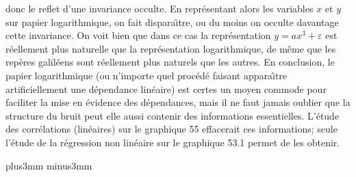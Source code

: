 donc le reflet d'une invariance occulte. 
\medskip 
En repr\'esentant alors les variables $x$ et $y$ sur papier 
logarithmique, on fait dispara{\^\i}tre, ou du moins on occulte davantage 
cette invariance. On voit bien que dans ce cas la repr\'esentation $y = 
ax^3 + \varepsilon$ est r\'eellement plus {\og naturelle\fg} que la 
repr\'esentation logarithmique, de m\^eme que les rep\`eres galil\'eens 
sont r\'eellement plus {\og naturels\fg} que les autres. 
\medskip 
En conclusion, le papier logarithmique (ou n'importe quel proc\'ed\'e
faisant appara{\^\i}tre artificiellement une d\'ependance lin\'eaire) est
certes un moyen commode pour faciliter la mise en \'evidence des 
d\'ependances, mais il ne faut jamais oublier que la structure du bruit 
peut elle aussi contenir des informations essentielles. L'\'etude des
corr\'elations (lin\'eaires) sur le graphique 55 effacerait ces
informations; seule l'\'etude de la r\'egression non lin\'eaire sur le 
graphique 53.1 permet de les obtenir. 
 
\vskip6mm plus3mm minus3mm

